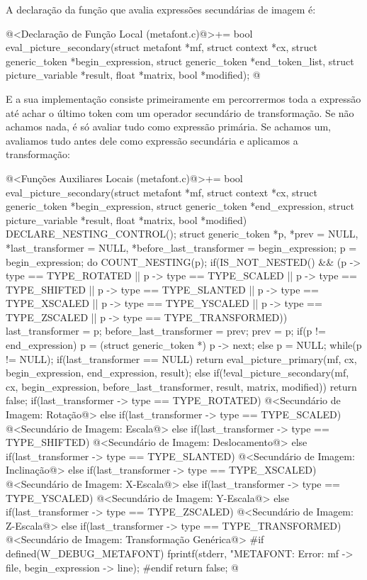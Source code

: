 {{{{{{A declaração da função que avalia expressões secundárias de imagem é:

\iniciocodigo
@<Declaração de Função Local (metafont.c)@>+=
bool eval_picture_secondary(struct metafont *mf, struct context *cx,
                            struct generic_token *begin_expression,
                            struct generic_token *end_token_list,
                            struct picture_variable *result,
                            float *matrix, bool *modified);
@
\fimcodigo

E a sua implementação consiste primeiramente em percorrermos toda a
expressão até achar o último token com um operador secundário de
transformação. Se não achamos nada, é só avaliar tudo como expressão
primária. Se achamos um, avaliamos tudo antes dele como expressão
secundária e aplicamos a transformação:

\iniciocodigo
@<Funções Auxiliares Locais (metafont.c)@>+=
bool eval_picture_secondary(struct metafont *mf, struct context *cx,
                            struct generic_token *begin_expression,
                            struct generic_token *end_expression,
                            struct picture_variable *result,
                            float *matrix, bool *modified){
  DECLARE_NESTING_CONTROL();
  struct generic_token *p, *prev = NULL, *last_transformer = NULL,
                       *before_last_transformer = begin_expression;
  p = begin_expression;
  do{
    COUNT_NESTING(p);
    if(IS_NOT_NESTED() && (p -> type == TYPE_ROTATED ||
       p -> type == TYPE_SCALED || p -> type == TYPE_SHIFTED ||
       p -> type == TYPE_SLANTED || p -> type == TYPE_XSCALED ||
       p -> type == TYPE_YSCALED || p -> type == TYPE_ZSCALED ||
       p -> type == TYPE_TRANSFORMED)){
      last_transformer = p;
      before_last_transformer = prev;
    }
    prev = p;
    if(p != end_expression)
      p = (struct generic_token *) p -> next;
    else
      p = NULL;
  }while(p != NULL);
  if(last_transformer == NULL)
    return eval_picture_primary(mf, cx, begin_expression, end_expression, result);
  else{
    if(!eval_picture_secondary(mf, cx, begin_expression,
                               before_last_transformer, result, matrix, modified))
      return false;
    if(last_transformer -> type == TYPE_ROTATED){
      @<Secundário de Imagem: Rotação@>
    }
    else if(last_transformer -> type == TYPE_SCALED){
      @<Secundário de Imagem: Escala@>
    }
    else if(last_transformer -> type == TYPE_SHIFTED){
      @<Secundário de Imagem: Deslocamento@>
    }
    else if(last_transformer -> type == TYPE_SLANTED){
      @<Secundário de Imagem: Inclinação@>
    }
    else if(last_transformer -> type == TYPE_XSCALED){
      @<Secundário de Imagem: X-Escala@>
    }
    else if(last_transformer -> type == TYPE_YSCALED){
      @<Secundário de Imagem: Y-Escala@>
    }
    else if(last_transformer -> type == TYPE_ZSCALED){
      @<Secundário de Imagem: Z-Escala@>
    }
    else if(last_transformer -> type == TYPE_TRANSFORMED){
      @<Secundário de Imagem: Transformação Genérica@>
    }
#if defined(W_DEBUG_METAFONT)
    fprintf(stderr, "METAFONT: Error: %
            mf -> file, begin_expression -> line);
#endif
    return false;
  }
}
@
\fimcodigo

}}}}}}
